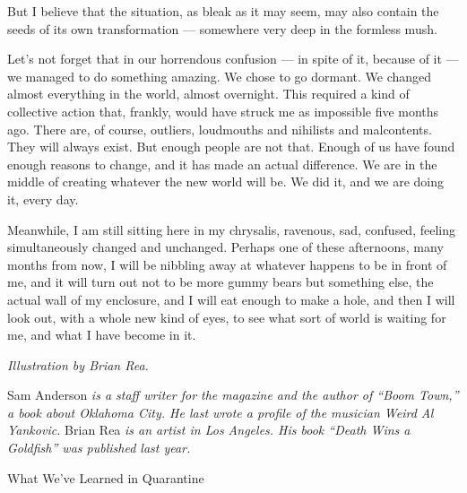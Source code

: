 But I believe that the situation, as bleak as it may seem, may also
contain the seeds of its own transformation --- somewhere very deep in
the formless mush.

Let's not forget that in our horrendous confusion --- in spite of it,
because of it --- we managed to do something amazing. We chose to go
dormant. We changed almost everything in the world, almost overnight.
This required a kind of collective action that, frankly, would have
struck me as impossible five months ago. There are, of course, outliers,
loudmouths and nihilists and malcontents. They will always exist. But
enough people are not that. Enough of us have found enough reasons to
change, and it has made an actual difference. We are in the middle of
creating whatever the new world will be. We did it, and we are doing it,
every day.

Meanwhile, I am still sitting here in my chrysalis, ravenous, sad,
confused, feeling simultaneously changed and unchanged. Perhaps one of
these afternoons, many months from now, I will be nibbling away at
whatever happens to be in front of me, and it will turn out not to be
more gummy bears but something else, the actual wall of my enclosure,
and I will eat enough to make a hole, and then I will look out, with a
whole new kind of eyes, to see what sort of world is waiting for me, and
what I have become in it.

\emph{Illustration by Brian Rea.}

Sam Anderson \emph{is a staff writer for the magazine and the author of
``Boom Town,'' a book about Oklahoma City. He last wrote a profile of
the musician Weird Al Yankovic.} Brian Rea \emph{is an artist in Los
Angeles. His book ``Death Wins a Goldfish'' was published last year.}

What We've Learned in Quarantine

